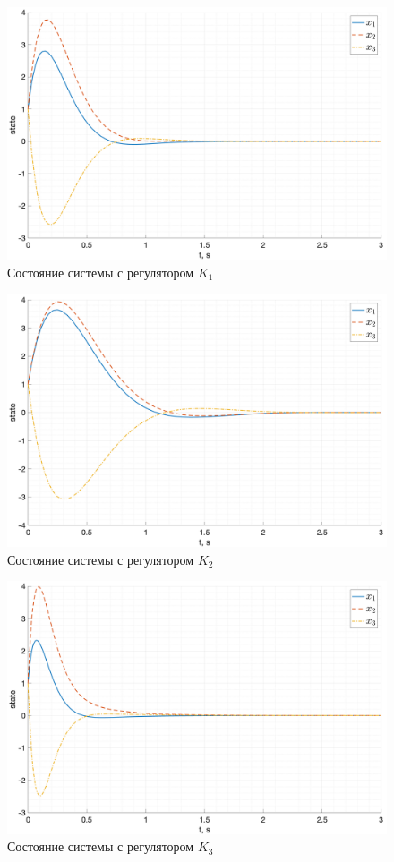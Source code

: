 \begin{figure}[ht!]
    \centering
    \includegraphics[width=\textwidth]{media/plots/lqr_task1/state_1.png}
    \caption{Состояние системы с регулятором $K_1$}
    \label{fig:task1_x_1}
\end{figure}
\begin{figure}[ht!]
    \centering
    \includegraphics[width=\textwidth]{media/plots/lqr_task1/state_2.png}
    \caption{Состояние системы с регулятором $K_2$}
    \label{fig:task1_x_2}
\end{figure}
\begin{figure}[ht!]
    \centering
    \includegraphics[width=\textwidth]{media/plots/lqr_task1/state_3.png}
    \caption{Состояние системы с регулятором $K_3$}
    \label{fig:task1_x_3}
\end{figure}    
